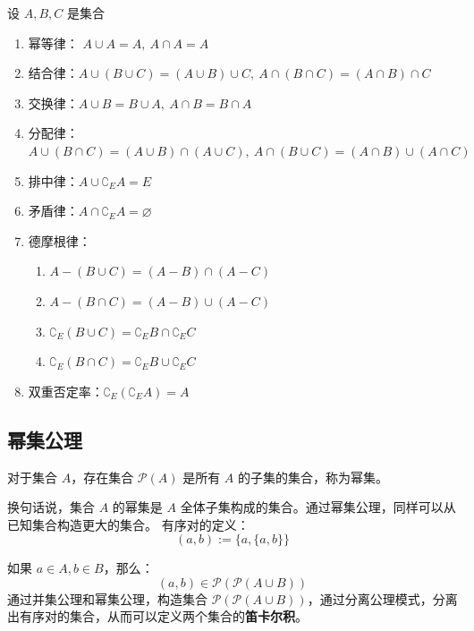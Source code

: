 \begin{proposition}[集合常用算律]
    设 $A,B,C$ 是集合
    \begin{enumerate}
        \item 幂等律： $A\cup A = A,\  A\cap A = A$
        \item 结合律：$A\cup (B\cup C) = (A\cup B)\cup C,\ A\cap(B\cap C) = (A\cap B)\cap C$
        \item 交换律：$A\cup B = B\cup A,\ A\cap B = B\cap A$
        \item 分配律：$ A\cup (B\cap C) = (A\cup B)\cap(A\cup C),\ A\cap (B\cup C) = (A\cap B)\cup(A\cap C) $
        \item 排中律：$A\cup \complement_EA = E$
        \item 矛盾律：$A\cap \complement_EA = \varnothing$
        \item 德摩根律：
        \begin{enumerate}
            \item $A-(B\cup C) = (A-B)\cap (A-C)$
            \item $A-(B\cap C) = (A-B)\cup (A-C)$
            \item $\complement_E(B\cup C) = \complement_EB\cap \complement_EC$
            \item $\complement_E(B\cap C) = \complement_EB\cup \complement_EC$
        \end{enumerate}
        \item 双重否定率：$ \complement_E(\complement_E A) = A $
    \end{enumerate}
    \label{prop:sets_laws}
\end{proposition}

\subsection{幂集公理}

\begin{axiom}
    对于集合 $ A $，存在集合 $ \mathcal{P}(A) $ 是所有 $ A $ 的子集的集合，称为幂集。
\end{axiom}

\begin{note}
    换句话说，集合 $ A $ 的幂集是 $ A $ 全体子集构成的集合。通过幂集公理，同样可以从已知集合构造更大的集合。 有序对的定义：
    \[
        (a,b) := \{a,\{a,b\}\} 
    \]

    如果 $ a\in A,b\in B $，那么：
    \[
        (a,b)\in \mathcal{P}(\mathcal{P}(A\cup B))
    \]
    通过并集公理和幂集公理，构造集合 $ \mathcal{P}(\mathcal{P}(A\cup B)) $，通过分离公理模式，分离出有序对的集合，从而可以定义两个集合的\textbf{笛卡尔积}。
\end{note}

